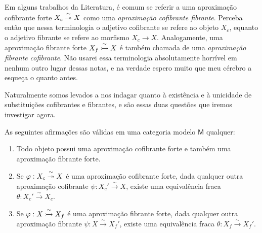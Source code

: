 \begin{obs}
  Em alguns trabalhos da Literatura, é comum se referir a uma aproximação cofibrante forte $X_{c} \overset{\sim}{\twoheadrightarrow} X$ como uma \emph{aproximação cofibrante fibrante}.
  Perceba então que nessa terminologia o adjetivo cofibrante se refere ao objeto $X_{c}$, equanto o adjetivo fibrante se refere ao morfismo $X_{c} \to X$.
  Analogamente, uma aproximação fibrante forte $X_{f} \overset{\sim}{\rightarrowtail} X$ é também chamada de uma \emph{aproximação fibrante cofibrante}.
  Não usarei essa terminologia absolutamente horrível em nenhum outro lugar dessas notas, e na verdade espero muito que meu cérebro a esqueça o quanto antes.
\end{obs}

Naturalmente somos levados a nos indagar quanto à existência e à unicidade de substituições cofibrantes e fibrantes, e são essas duas questões que iremos investigar agora.

\begin{prop}
  As seguintes afirmações são válidas em uma categoria modelo $\mathsf{M}$ qualquer:
  \begin{enumerate}
  \item Todo objeto possui uma aproximação cofibrante forte e também uma aproximação fibrante forte.
    
  \item Se $\varphi: X_{c} \overset{\sim}{\twoheadrightarrow} X$ é uma aproximação cofibrante forte, dada qualquer outra aproximação cofibrante $\psi: X_{c}' \overset{\sim}{\to} X$, existe uma equivalência fraca $\theta: X_{c}' \overset{\sim}{\to} X_{c}$.
    
  \item Se $\varphi: X \overset{\sim}{\rightarrowtail} X_{f}$ é uma aproximação fibrante forte, dada qualquer outra aproximação fibrante $\psi: X \overset{\sim}{\to} X_{f}'$, existe uma equivalência fraca $\theta: X_{f} \overset{\sim}{\to} X_{f}'$.
  \end{enumerate}
\end{prop}

